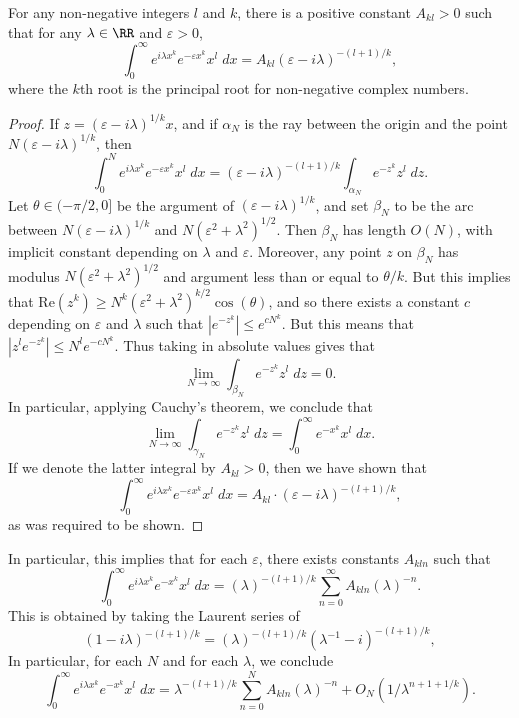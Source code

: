 \begin{lemma}
  For any non-negative integers $l$ and $k$, there is a positive constant $A_{kl} > 0$ such that for any $\lambda \in \RR$ and $\varepsilon > 0$,
  \[ \int_0^\infty e^{i \lambda x^k} e^{-\varepsilon x^k} x^l\; dx = A_{kl} (\varepsilon - i \lambda)^{-(l+1)/k}, \]
  where the $k$th root is the principal root for non-negative complex numbers.
\end{lemma}
\begin{proof}
  If $z = (\varepsilon - i \lambda)^{1/k} x$, and if $\alpha_N$ is the ray between the origin and the point $N (\varepsilon - i \lambda)^{1/k}$, then
  \[ \int_0^N e^{i \lambda x^k} e^{- \varepsilon x^k} x^l\; dx = (\varepsilon - i \lambda)^{-(l+1)/k} \int_{\alpha_N} e^{-z^k} z^l\; dz. \]
  Let $\theta \in (-\pi/2,0]$ be the argument of $(\varepsilon - i \lambda)^{1/k}$, and set $\beta_N$ to be the arc between $N ( \varepsilon - i \lambda)^{1/k}$ and $N (\varepsilon^2 + \lambda^2)^{1/2}$. Then $\beta_N$ has length $O(N)$, with implicit constant depending on $\lambda$ and $\varepsilon$. Moreover, any point $z$ on $\beta_N$ has modulus $N (\varepsilon^2 + \lambda^2)^{1/2}$ and argument less than or equal to $\theta / k$. But this implies that $\text{Re}(z^k) \geq N^k (\varepsilon^2 + \lambda^2)^{k/2} \cos(\theta)$, and so there exists a constant $c$ depending on $\varepsilon$ and $\lambda$ such that $|e^{-z^k}| \leq e^{c N^k}$. But this means that $|z^l e^{-z^k}| \leq N^l e^{-cN^k}$. Thus taking in absolute values gives that
  \[ \lim_{N \to \infty} \int_{\beta_N} e^{-z^k} z^l\; dz = 0. \]
  In particular, applying Cauchy's theorem, we conclude that
  \[ \lim_{N \to \infty} \int_{\gamma_N} e^{-z^k} z^l\; dz = \int_0^\infty e^{-x^k} x^l\; dx. \]
  If we denote the latter integral by $A_{kl} > 0$, then we have shown that
  \[ \int_0^\infty e^{i \lambda x^k} e^{-\varepsilon x^k} x^l\; dx = A_{kl} \cdot (\varepsilon - i \lambda)^{-(l+1)/k}, \]
  as was required to be shown.
\end{proof}

\begin{remark}
  In particular, this implies that for each $\varepsilon$, there exists constants $A_{kln}$ such that
  \[ \int_0^\infty e^{i \lambda x^k} e^{-x^k} x^l\; dx = (\lambda)^{-(l+1)/k} \sum_{n = 0}^\infty A_{kln} (\lambda)^{-n}. \]
  This is obtained by taking the Laurent series of
  \[ (1 - i \lambda)^{-(l+1)/k} = (\lambda)^{-(l+1)/k} (\lambda^{-1} - i)^{-(l+1)/k}, \]
  In particular, for each $N$ and for each $\lambda$, we conclude
  \[ \int_0^\infty e^{i \lambda x^k} e^{-x^k} x^l\; dx = \lambda^{-(l+1)/k} \sum_{n = 0}^N A_{kln} (\lambda)^{-n} + O_N \left(1/\lambda^{n + 1 + 1/k} \right). \]
\end{remark}

